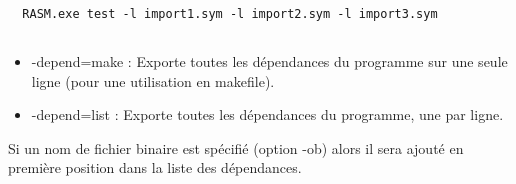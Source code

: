 \begin{verbatim}
  RASM.exe test -l import1.sym -l import2.sym -l import3.sym
\end{verbatim}





\subsection{}

\begin{xfr}
  \begin{itemize}
    \item -depend=make : Exporte toutes les dépendances du programme sur une seule ligne (pour une utilisation en makefile).
    \item -depend=list : Exporte toutes les dépendances du programme, une par ligne.
  \end{itemize}
  Si un nom de fichier binaire est spécifié (option -ob) alors il sera ajouté en première position dans la liste des dépendances.
\end{xfr}

